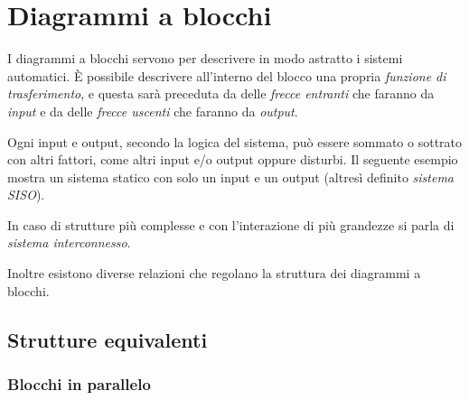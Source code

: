 \chapter{Diagrammi a blocchi}

I diagrammi a blocchi servono per descrivere in modo astratto i sistemi automatici.
È possibile descrivere all'interno del blocco una propria \emph{funzione di trasferimento},
e questa sarà preceduta da delle \emph{frecce entranti} che faranno da \emph{input} e
da delle \emph{frecce uscenti} che faranno da \emph{output}.

Ogni input e output, secondo la logica del sistema, può essere sommato o sottrato con
altri fattori, come altri input e/o output oppure disturbi.
Il seguente esempio mostra un sistema statico con solo un input e un output
(altresì definito \emph{sistema SISO}).
\begin{center}\end{center}

In caso di strutture più complesse e con l'interazione di più grandezze si parla
di \emph{sistema interconnesso}.

Inoltre esistono diverse relazioni che regolano la struttura dei diagrammi a blocchi.

\section{Strutture equivalenti}
\subsection{Blocchi in parallelo}
\begin{center}\end{center}


